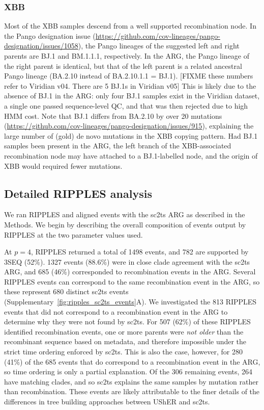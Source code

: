 \documentclass[12pt]{article}
\newcommand{\siref}[1]{Supplementary~\ref{#1}}
\begin{document}

\subsubsection{XBB}
\label{sec:dd_xbb}

Most of the XBB samples descend from a well supported recombination node.
In the Pango designation issue
(\url{https://github.com/cov-lineages/pango-designation/issues/1058}),
the Pango lineages of the suggested left and right parents are
BJ.1 and BM.1.1.1, respectively.
In the ARG, the Pango lineage of the right parent is identical,
but that of the left parent is a related ancestral Pango lineage
(BA.2.10 instead of BA.2.10.1.1 = BJ.1).
[FIXME these numbers refer to Viridian v04. There are 5 BJ.1s in Viridian v05]
This is likely due to the absence of BJ.1 in the ARG:
only four BJ.1 samples exist in the Viridian dataset,
a single one passed sequence-level QC, and
that was then rejected due to high HMM cost.
Note that BJ.1 differs from BA.2.10 by over 20 mutations
(\url{https://github.com/cov-lineages/pango-designation/issues/915}),
explaining the large number of (gold) de novo mutations
in the XBB copying pattern.
Had BJ.1 samples been present in the ARG,
the left branch of
the XBB-associated recombination node
may have attached to a BJ.1-labelled node, and
the origin of XBB would required fewer mutations.


\subsection{Detailed RIPPLES analysis}
\label{sec:detailed_ripples}
We ran RIPPLES and aligned events with the sc2ts ARG as described in
the Methods. We begin by describing the overall composition of events output
by RIPPLES at the two parameter values used.

At $p=4$, RIPPLES returned a total of 1498 events, and
782 are supported by 3SEQ (52\%). 1327 events
(88.6\%) were in close clade agreement with the sc2ts ARG,
and 685 (46\%) corresponded to recombination events in the ARG.
Several RIPPLES events can correspond to the same recombination event
in the ARG, so these represent 680 distinct sc2ts events
(\siref{fig:ripples_sc2ts_events}A).
We investigated the 813 RIPPLES events that did not correspond
to a recombination event in the ARG
to determine why they were not found by sc2ts.
For 507 (62\%) of these RIPPLES identified recombination events,
one or more parents were \emph{not older} than the
recombinant sequence based on metadata,
and therefore impossible under the strict time ordering
enforced by sc2ts.
This is also the case, however, for 280 (41\%) of the 685 events
that do correspond to a recombination event in the ARG,
so time ordering is only a partial explanation.
Of the 306 remaining events, 264 have matching clades,
and so sc2ts explains the same samples by mutation rather than recombination.
These events are likely attributable
to the finer details of the
differences in tree building approaches between UShER and sc2ts.
\end{document}
